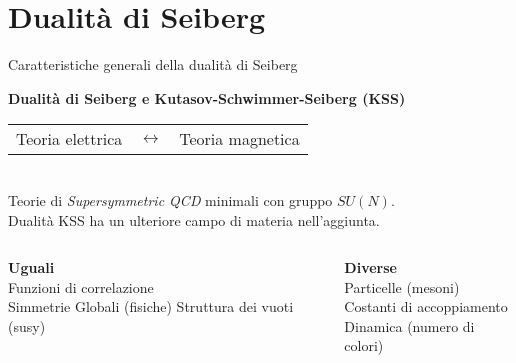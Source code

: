 \documentclass[10pt,compress,usenames,dvipsnames]{beamer}
\begin{document}
\section{Dualità di Seiberg}



\begin{frame}{Caratteristiche generali della dualità di Seiberg}
\begin{center}
 \begin{center}
 {\bfseries \Large Dualità di Seiberg e Kutasov-Schwimmer-Seiberg (KSS)} \\[0,4cm]
\end{center}
\begin{tabular}{r c l }
{ \large Teoria elettrica } & $\longleftrightarrow$ & {\large Teoria magnetica}
\end{tabular}
\\[0,2cm]

{ 
	Teorie di \textit{Supersymmetric QCD} minimali con gruppo $SU(N)$.\\
	Dualità KSS ha un ulteriore campo di materia nell'aggiunta.  
}
%
\end{center}
\begin{columns}[c]
	\begin{column}{0.5 \textwidth}			
		\begin{center}
		{\bfseries Uguali} \\
		Funzioni di correlazione \\
		Simmetrie Globali (\alert{fisiche})
		Struttura dei vuoti (susy)
		\vspace{0,3cm}
		\end{center}
	\end{column}

	\begin{column}{0.5 \textwidth}
\vspace{-0,3cm}
		\begin{center}
		{\bfseries Diverse}\\
		Particelle (\alert{mesoni})\\
		Costanti di accoppiamento \\
		Dinamica (\alert{numero di colori})\\
		\end{center}
	\end{column}
\end{columns}
\begin{center}
\end{center}
\end{frame}
\end{document}
